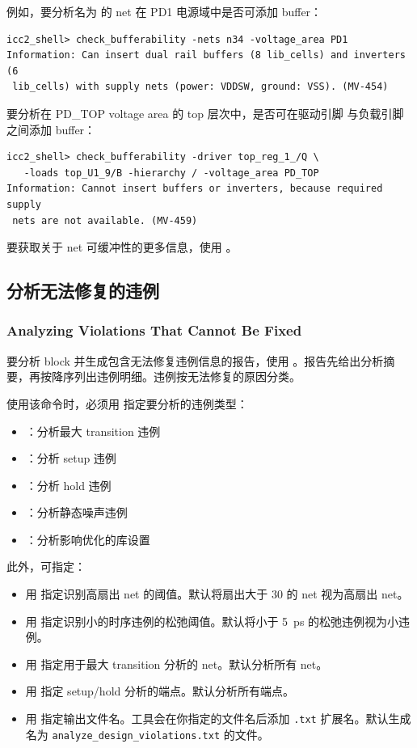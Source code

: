 例如，要分析名为  的 net 在 PD1 电源域中是否可添加 buffer：
\begin{lstlisting}
icc2_shell> check_bufferability -nets n34 -voltage_area PD1
Information: Can insert dual rail buffers (8 lib_cells) and inverters (6
 lib_cells) with supply nets (power: VDDSW, ground: VSS). (MV-454)
\end{lstlisting}

要分析在 PD\_TOP voltage area 的 top 层次中，是否可在驱动引脚  与负载引脚  之间添加 buffer：
\begin{lstlisting}
icc2_shell> check_bufferability -driver top_reg_1_/Q \
   -loads top_U1_9/B -hierarchy / -voltage_area PD_TOP
Information: Cannot insert buffers or inverters, because required supply
 nets are not available. (MV-459)
\end{lstlisting}

要获取关于 net 可缓冲性的更多信息，使用 。

\subsection{分析无法修复的违例}
\subsubsection*{Analyzing Violations That Cannot Be Fixed}

要分析 block 并生成包含无法修复违例信息的报告，使用 。报告先给出分析摘要，再按降序列出违例明细。违例按无法修复的原因分类。

使用该命令时，必须用  指定要分析的违例类型：
\begin{itemize}
  \item {}：分析最大 transition 违例
  \item {}：分析 setup 违例
  \item {}：分析 hold 违例
  \item {}：分析静态噪声违例
  \item {}：分析影响优化的库设置
\end{itemize}

此外，可指定：
\begin{itemize}
  \item 用  指定识别高扇出 net 的阈值。默认将扇出大于 30 的 net 视为高扇出 net。
  \item 用 \opt{-slack} 指定识别小的时序违例的松弛阈值。默认将小于 5~ps 的松弛违例视为小违例。
  \item 用  指定用于最大 transition 分析的 net。默认分析所有 net。
  \item 用 \opt{-endpoints} 指定 setup/hold 分析的端点。默认分析所有端点。
  \item 用  指定输出文件名。工具会在你指定的文件名后添加 \texttt{.txt} 扩展名。默认生成名为 \texttt{analyze\_design\_violations.txt} 的文件。
\end{itemize}

